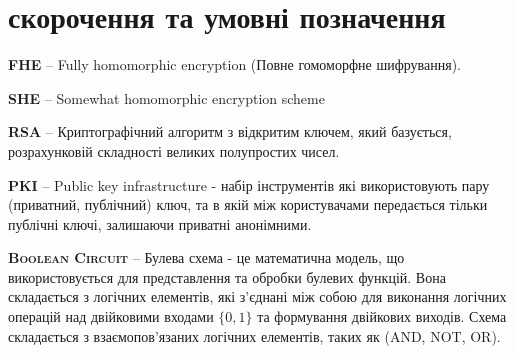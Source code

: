 \newpage
\chapter*{скорочення та умовні позначення}

\textbf{\textsc{FHE}} -- Fully homomorphic encryption (Повне гомоморфне шифрування).

\textbf{\textsc{SHE}} -- Somewhat homomorphic encryption scheme

\textbf{\textsc{RSA}} -- Криптографічний алгоритм з відкритим ключем, який базується,
розрахунковій складності великих полупростих чисел.

\textbf{\textsc{PKI}} -- Public key infrastructure - набір інструментів які
використовують пару (приватний, публічний) ключ, та в якій між користувачами
передається тільки публічні ключі, залишаючи приватні анонімними.

\textbf{\textsc{Boolean Circuit}} -- Булева схема - це математична модель, що
використовується для представлення та обробки булевих функцій. Вона складається з логічних
елементів, які з'єднані між собою для виконання логічних операцій над двійковими входами
\(\{0,1\}\) та формування двійкових виходів. Схема складається з взаємопов'язаних логічних
елементів, таких як (AND, NOT, OR). 
